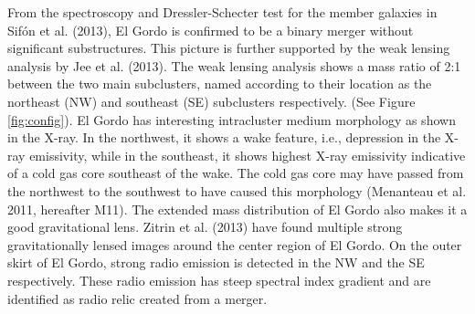 From the spectroscopy and Dressler-Schecter test for the member galaxies  in Sif\'{o}n et al. (2013), El Gordo is confirmed to be a binary merger 
without significant substructures. This picture is further supported by the
weak lensing analysis by Jee et al. (2013). The weak lensing analysis shows
a mass ratio of 2:1  between the two main subclusters, named according to their location as the northeast (NW) and southeast (SE) subclusters respectively. 
(See Figure \ref{fig:config}). El Gordo has interesting intracluster medium morphology as shown in the X-ray. In the northwest, it shows a wake feature, i.e.,
depression in the X-ray emissivity, while in the southeast, it shows
highest X-ray emissivity indicative of a cold gas core southeast of the
wake. The cold gas core may have passed from the northwest to the southwest
to have caused this morphology (Menanteau et al. 2011, hereafter M11). 
The extended mass distribution of El Gordo also makes it a good
gravitational lens. Zitrin et al. (2013) have found multiple strong
gravitationally lensed images around the center region of El Gordo. 
On the outer skirt of El Gordo, strong radio emission is detected in
the NW and the SE respectively. These radio emission has steep spectral
index gradient and are identified as radio relic created from a merger.\par 
